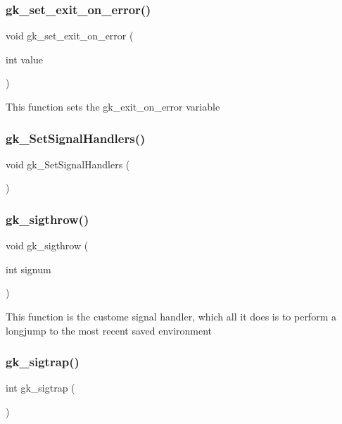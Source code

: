 \subsubsection{\texorpdfstring{gk\+\_\+set\+\_\+exit\+\_\+on\+\_\+error()}{gk\_set\_exit\_on\_error()}}
{\footnotesize\ttfamily void gk\+\_\+set\+\_\+exit\+\_\+on\+\_\+error (\begin{DoxyParamCaption}\item[{int}]{value }\end{DoxyParamCaption})}

This function sets the gk\+\_\+exit\+\_\+on\+\_\+error variable \mbox{\label{a00026_a6eadb77c33b5cf46e2faa0a1f7923f50}} 
\subsubsection{\texorpdfstring{gk\+\_\+\+Set\+Signal\+Handlers()}{gk\_SetSignalHandlers()}}
{\footnotesize\ttfamily void gk\+\_\+\+Set\+Signal\+Handlers (\begin{DoxyParamCaption}{ }\end{DoxyParamCaption})}

\mbox{\label{a00026_ad17d21ff26300b9b5bdb291e8ad2bcef}} 
\subsubsection{\texorpdfstring{gk\+\_\+sigthrow()}{gk\_sigthrow()}}
{\footnotesize\ttfamily void gk\+\_\+sigthrow (\begin{DoxyParamCaption}\item[{int}]{signum }\end{DoxyParamCaption})}

This function is the custome signal handler, which all it does is to perform a longjump to the most recent saved environment \mbox{\label{a00026_a05869524d1c30cfaab2a8690e7da6fd4}} 
\subsubsection{\texorpdfstring{gk\+\_\+sigtrap()}{gk\_sigtrap()}}
{\footnotesize\ttfamily int gk\+\_\+sigtrap (\begin{DoxyParamCaption}{ }\end{DoxyParamCaption})}

